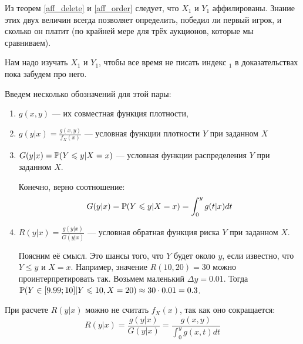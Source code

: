 Из теорем \ref{aff_delete} и \ref{aff_order} следует, что $ X_{1} $ и $ Y_{1} $ аффилированы. Знание этих двух величин всегда позволяет определить, победил ли первый игрок, и сколько он платит (по крайней мере для трёх аукционов, которые мы сравниваем).

Нам надо изучать $ X_{1} $ и $ Y_{1} $, чтобы все время не писать индекс $ _{1} $ в доказательствах пока забудем про него.

Введем несколько обозначений для этой пары:
\begin{enumerate}
\item $ g(x,y) $ — их совместная функция плотности,
\item $ g(y|x)=\frac{g(x,y)}{f_{X}(x)} $ — условная функции плотности $ Y $ при заданном $ X $
\item $ G(y|x)=\P(Y\leq y|X=x)$ — условная функции распределения $ Y $ при заданном $ X $.

Конечно, верно соотношение:
\begin{equation}
G(y|x)=\P(Y\leq y|X=x)=\int_{0}^{y}g(t|x)dt
\end{equation}

\item $ R(y|x)=\frac{g(y|x)}{G(y|x)} $ — условная обратная функция риска $ Y $ при заданном $ X $.

Поясним её смысл. Это шансы того, что $ Y $ будет около $ y $, если известно, что $ Y\leq y $ и $ X=x $. Например, значение $ R(10,20)=30 $ можно проинтерпретировать так. Возьмем маленький $ \Delta y=0.01 $. Тогда $ \P(Y\in [9.99;10]|Y\leq 10, X=20)\approx 30\cdot 0.01=0.3 $.
\end{enumerate}

При расчете $ R(y|x) $ можно не считать $ f_{X}(x) $, так как оно сокращается:
\begin{equation}
R(y|x)=\frac{g(y|x)}{G(y|x)}=\frac{g(x,y)}{\int_{0}^{y}g(x,t)dt}
\end{equation}

